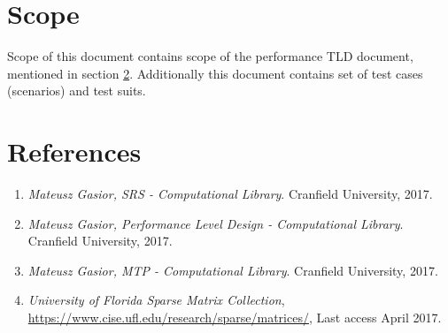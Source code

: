 \section{Scope} \label{s:introduction:scope}
	\begin{comment}
		Identify the test items (software or system) that are the object of testing, e.g., specific attributes of the
		software, the installation instructions, the user instructions, interfacing hardware, database conversion
		software that is not a part of the operational system) including their version/revision level. Also
		identify any procedures for their transfer from other environments to the test environment.
		Supply references to the test item documentation relevant to an individual level of test, if it exists, such
		as follows:
		⎯ Requirements
		⎯ Design
		⎯ User’s guide
		⎯ Operations guide
		⎯ Installation guide
		Reference any Anomaly Reports relating to the test items.
		Identify any items that are to be specifically excluded from testing.
	\end{comment}
	Scope of this document contains scope of the performance \gls{TLD} document, mentioned in section \ref{s:introduction:references}. Additionally this document contains set of test cases (scenarios) and test suits.
	
	\begin{center}
	\end{center}
\section{References} \label{s:introduction:references}
	\begin{comment}
		List all of the applicable reference documents. The references are separated into “external” references
		that are imposed external to the project and “internal” references that are imposed from within to the
		project. This may also be at the end of the document.
	\end{comment}
	\begin{enumerate}
		\item \emph{Mateusz Gasior, \gls{SRS} - Computational Library}. Cranfield University, 2017.
		\item \emph{Mateusz Gasior, Performance Level Design - Computational Library}. Cranfield University, 2017.
		\item \emph{Mateusz Gasior, \gls{MTP} - Computational Library}. Cranfield University, 2017.
		\item \emph{University of Florida Sparse Matrix Collection}, \url{https://www.cise.ufl.edu/research/sparse/matrices/}, Last access April 2017.
	\end{enumerate}

